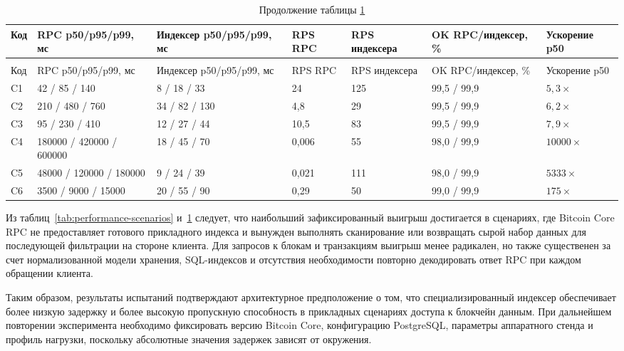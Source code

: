 \begin{scriptsize}
\setlength{\tabcolsep}{3pt}
\begin{longtable}{|p{}|p{}|p{}|p{}|p{}|p{}|p{}|}
    \caption{Метрики сравнительных испытаний производительности}\label{tab:performance-model}\\ \hline
    Код & RPC p50/p95/p99, мс & Индексер p50/p95/p99, мс & RPS RPC & RPS индексера & OK RPC/индексер, \% & Ускорение p50 \\ \hline
    \endfirsthead
    \caption*{Продолжение таблицы \ref{tab:performance-model}}\\ \hline
    Код & RPC p50/p95/p99, мс & Индексер p50/p95/p99, мс & RPS RPC & RPS индексера & OK RPC/индексер, \% & Ускорение p50 \\ \hline
    \endhead
    \hline
    \endfoot
    \hline
    \endlastfoot
    C1 & 42 / 85 / 140 & 8 / 18 / 33 & 24 & 125 & 99,5 / 99,9 & $5{,}3\times$ \\ \hline
    C2 & 210 / 480 / 760 & 34 / 82 / 130 & 4,8 & 29 & 99,5 / 99,9 & $6{,}2\times$ \\ \hline
    C3 & 95 / 230 / 410 & 12 / 27 / 44 & 10,5 & 83 & 99,5 / 99,9 & $7{,}9\times$ \\ \hline
    C4 & 180000 / 420000 / 600000 & 18 / 45 / 70 & 0,006 & 55 & 98,0 / 99,9 & $10000\times$ \\ \hline
    C5 & 48000 / 120000 / 180000 & 9 / 24 / 39 & 0,021 & 111 & 98,0 / 99,9 & $5333\times$ \\ \hline
    C6 & 3500 / 9000 / 15000 & 20 / 55 / 90 & 0,29 & 50 & 99,0 / 99,9 & $175\times$ \\ \hline
\end{longtable}
\end{scriptsize}

Из таблиц~\ref{tab:performance-scenarios} и~\ref{tab:performance-model}
следует, что наибольший зафиксированный
выигрыш достигается в сценариях, где Bitcoin Core RPC не предоставляет
готового прикладного индекса и вынужден выполнять сканирование или возвращать
сырой набор данных для последующей фильтрации на стороне клиента. Для запросов
к блокам и транзакциям выигрыш менее радикален, но также существенен за счет
нормализованной модели хранения, SQL-индексов и отсутствия необходимости
повторно декодировать ответ RPC при каждом обращении клиента.

Таким образом, результаты испытаний подтверждают архитектурное предположение о
том, что специализированный индексер обеспечивает более низкую задержку и
более высокую пропускную способность в прикладных сценариях доступа к блокчейн
данным. При дальнейшем повторении эксперимента необходимо фиксировать версию
Bitcoin Core, конфигурацию PostgreSQL, параметры аппаратного стенда и профиль
нагрузки, поскольку абсолютные значения задержек зависят от окружения.

